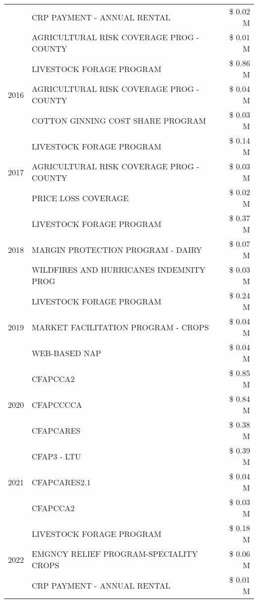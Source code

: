 \begin{tabular}{llr}
 & CRP PAYMENT - ANNUAL RENTAL & \$ 0.02 M \\
 & AGRICULTURAL RISK COVERAGE PROG - COUNTY & \$ 0.01 M \\
\cline{1-3}
\multirow[t]{3}{*}{2016} & LIVESTOCK FORAGE PROGRAM & \$ 0.86 M \\
 & AGRICULTURAL RISK COVERAGE PROG - COUNTY & \$ 0.04 M \\
 & COTTON GINNING COST SHARE PROGRAM & \$ 0.03 M \\
\cline{1-3}
\multirow[t]{3}{*}{2017} & LIVESTOCK FORAGE PROGRAM & \$ 0.14 M \\
 & AGRICULTURAL RISK COVERAGE PROG - COUNTY & \$ 0.03 M \\
 & PRICE LOSS COVERAGE & \$ 0.02 M \\
\cline{1-3}
\multirow[t]{3}{*}{2018} & LIVESTOCK FORAGE PROGRAM & \$ 0.37 M \\
 & MARGIN PROTECTION PROGRAM - DAIRY & \$ 0.07 M \\
 & WILDFIRES AND HURRICANES INDEMNITY PROG & \$ 0.03 M \\
\cline{1-3}
\multirow[t]{3}{*}{2019} & LIVESTOCK FORAGE PROGRAM & \$ 0.24 M \\
 & MARKET FACILITATION PROGRAM - CROPS & \$ 0.04 M \\
 & WEB-BASED NAP & \$ 0.04 M \\
\cline{1-3}
\multirow[t]{3}{*}{2020} & CFAPCCA2 & \$ 0.85 M \\
 & CFAPCCCCA & \$ 0.84 M \\
 & CFAPCARES & \$ 0.38 M \\
\cline{1-3}
\multirow[t]{3}{*}{2021} & CFAP3 - LTU & \$ 0.39 M \\
 & CFAPCARES2.1 & \$ 0.04 M \\
 & CFAPCCA2 & \$ 0.03 M \\
\cline{1-3}
\multirow[t]{3}{*}{2022} & LIVESTOCK FORAGE PROGRAM & \$ 0.18 M \\
 & EMGNCY RELIEF PROGRAM-SPECIALITY CROPS & \$ 0.06 M \\
 & CRP PAYMENT - ANNUAL RENTAL & \$ 0.01 M \\
\cline{1-3}
\bottomrule
\end{tabular}

